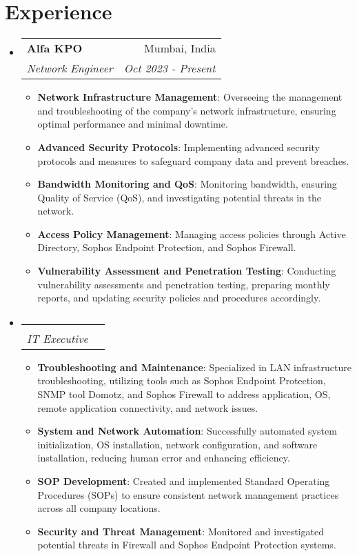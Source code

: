 \documentclass[letterpaper,11pt]{article}
\makeatletter
\newcommand{\resumeItem}[2]{
  \item\small{
    \textbf{#1}{: #2 \vspace{-2pt}}
  }
}
\newcommand{\resumeSubheading}[4]{
  \vspace{-1pt}\item
    \begin{tabular*}{0.97\textwidth}[t]{l@{\extracolsep{\fill}}r}
      \textbf{#1} & #2 \\
      \textit{\small#3} & \textit{\small #4} \\
    \end{tabular*}\vspace{-5pt}
}
\newcommand{\resumeSubHeadingListStart}{\begin{itemize}[leftmargin=*]}
\newcommand{\resumeSubHeadingListEnd}{\end{itemize}}
\newcommand{\resumeItemListStart}{\begin{itemize}}
\newcommand{\resumeItemListEnd}{\end{itemize}\vspace{-5pt}}
\makeatother
\begin{document}
\section{Experience}
  \resumeSubHeadingListStart

    \resumeSubheading
      {Alfa KPO}{Mumbai, India}
      {Network Engineer}{Oct 2023 - Present}
      \resumeItemListStart
        \resumeItem{Network Infrastructure Management}
          {Overseeing the management and troubleshooting of the company’s network infrastructure, ensuring optimal performance and minimal downtime.}
        \resumeItem{Advanced Security Protocols}
          {Implementing advanced security protocols and measures to safeguard company data and prevent breaches.}
        \resumeItem{Bandwidth Monitoring and QoS}
          {Monitoring bandwidth, ensuring Quality of Service (QoS), and investigating potential threats in the network.}
        \resumeItem{Access Policy Management}
          {Managing access policies through Active Directory, Sophos Endpoint Protection, and Sophos Firewall.}
          \resumeItem{Vulnerability Assessment and Penetration Testing}
          {Conducting vulnerability assessments and penetration testing, preparing monthly reports, and updating security policies and procedures accordingly.}
      \resumeItemListEnd

    \resumeSubheading
      {}{}
      {IT Executive}{}
      \resumeItemListStart
        \resumeItem{Troubleshooting and Maintenance}
          {Specialized in LAN infrastructure troubleshooting, utilizing tools such as Sophos Endpoint Protection, SNMP tool Domotz, and Sophos Firewall to address application, OS, remote application connectivity, and network issues.}
        \resumeItem{System and Network Automation}
          {Successfully automated system initialization, OS installation, network configuration, and software installation, reducing human error and enhancing efficiency.}
        \resumeItem{SOP Development}
          {Created and implemented Standard Operating Procedures (SOPs) to ensure consistent network management practices across all company locations.}
        \resumeItem{Security and Threat Management}
          {Monitored and investigated potential threats in Firewall and Sophos Endpoint Protection systems.}
      \resumeItemListEnd

  \resumeSubHeadingListEnd



\end{document}
